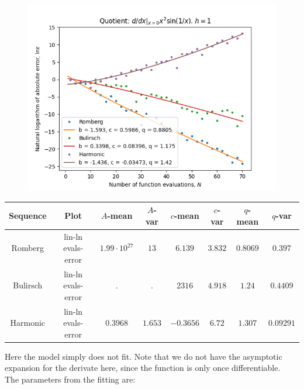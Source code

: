 \begin{figure}[H]
\centering
\begin{minipage}{0.45\textwidth}
\centering
\includegraphics[scale=0.45]{../results/diff_quot_plots/xsin_hp_trend.png}
\end{minipage}
\end{figure}

\begin{table}[H]
    \centering
    \small
    \small
    \begin{tabular}{c|c||c|c|c|c|c|c}
Sequence & Plot & \(A\)-mean & \(A\)-var & \(c\)-mean & \(c\)-var & \(q\)-mean & \(q\)-var\\\hline
\rowcolor{red}
Romberg & lin-ln evals-error & \(1.99\cdot 10^{27}\) & \(13\) & \(6.139\) & \(3.832\) & \(0.8069\) & \(0.397\) \\
\rowcolor{red}
Bulirsch & lin-ln evals-error & \(.\) & \(.\) & \(2316\) & \(4.918\) & \(1.24\) & \(0.4409\) \\
\rowcolor{red}
Harmonic & lin-ln evals-error & \(0.3968\) & \(1.653\) & \(-0.3656\) & \(6.72\) & \(1.307\) & \(0.09291\) \\
    \end{tabular}
    \label{tab:my_label}
\end{table}

Here the model simply does not fit. Note that we do not have the asymptotic expansion for the derivate here, since the function is only once differentiable.\\

The parameters from the fitting are:

